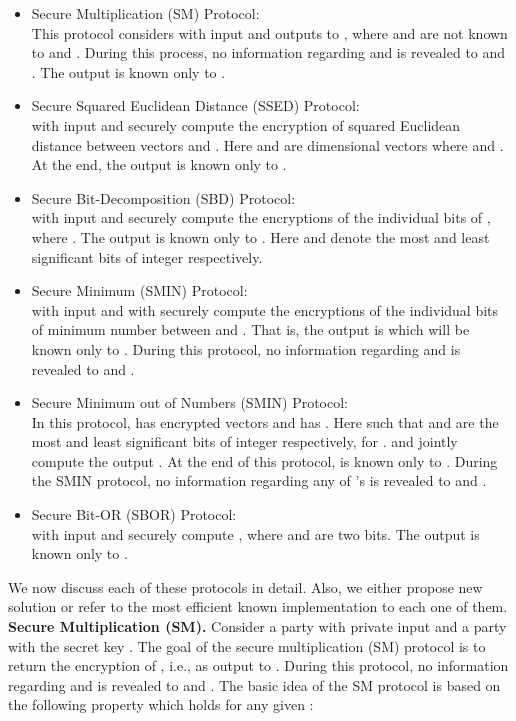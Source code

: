 \documentclass{article}
\begin{document}
\begin{itemize}
\item Secure Multiplication (SM) Protocol:\\ 
This protocol considers  
with input  and outputs  to , where  and 
 are not known to  and . 
During this process, no information regarding  and  is revealed to  and . The output  is known only to .
\item Secure Squared Euclidean Distance (SSED) Protocol:\\ 
 with input  
and  securely compute the encryption of squared Euclidean distance between vectors  and . 
Here  and  are  dimensional vectors where  and 
. At the end, the output  
 is known only to .
\item Secure Bit-Decomposition (SBD) Protocol:\\ 
 with input  and  securely compute the 
encryptions of the individual bits of , where . The 
output  is known only to . Here  and  
denote the most and least significant bits of integer  respectively.
\item Secure Minimum (SMIN) Protocol:\\ 
 with input  and  with  securely compute 
the encryptions of the individual bits of minimum number between  and . 
That is, the output is  which will be known only to . During this protocol, 
no information regarding  and  is revealed to  and .
\item Secure Minimum out of  Numbers (SMIN) Protocol:\\ 
In this protocol,  has  encrypted vectors  and 
 has . Here  such that 
 and  are the most and least significant bits of integer  respectively, 
for .  and  jointly compute the output . 
At the end of this protocol,  is known only to . During the SMIN 
protocol, no information regarding any of 's is revealed to  and .
\item Secure Bit-OR (SBOR) Protocol:\\
 with input  and  securely compute 
, where  and  are two bits. The output  is 
known only to . 
\end{itemize}
We now discuss each of these protocols in detail. 
Also, we either propose new solution or refer to the most efficient 
known implementation to each one of them. \\


\noindent \textbf {Secure Multiplication (SM). }
Consider a party  with private input  and a 
party  with the secret key . The goal of the secure multiplication (SM) 
protocol is to return the encryption 
of , i.e.,  as output to . During this protocol, no information regarding 
 and  is revealed to  and . The basic idea of the SM protocol 
is based on the following property which holds 
for any given : 
\end{document}
